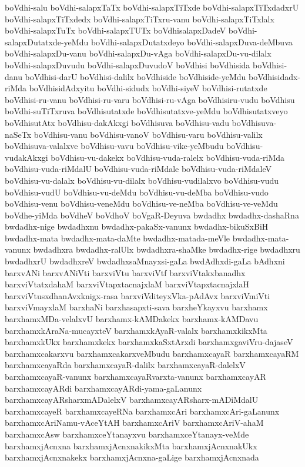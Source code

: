 {boVdhi-salu
boVdhi-salapxTaTx
boVdhi-salapxTiTxde
boVdhi-salapxTiTxdadxrU
boVdhi-salapxTiTxdedx
boVdhi-salapxTiTxru-vanu
boVdhi-salapxTiTxlalx
boVdhi-salapxTuTx
boVdhi-salapxTUTx
boVdhisalapxDadeV
boVdhi-salapxDutatxde-yeMdu
boVdhi-salapxDutatxdeyo
boVdhi-salapxDuva-deMbuva
boVdhi-salapxDu-vanu
boVdhi-salapxDu-vAga
boVdhi-salapxDu-vu-dilalx
boVdhi-salapxDuvudu
boVdhi-salapxDuvudoV
boVdhisi
boVdhisida
boVdhisi-danu
boVdhisi-darU
boVdhisi-dalilx
boVdhiside
boVdhiside-yeMdu
boVdhisidadx-riMda
boVdhisidAdxyitu
boVdhi-sidudx
boVdhi-siyeV
boVdhisi-rutatxde
boVdhisi-ru-vanu
boVdhisi-ru-varu
boVdhisi-ru-vAga
boVdhisiru-vudu
boVdhisu
boVdhi-suTiTxruva
boVdhisutatxde
boVdhisutatxve-yeMdu
boVdhisutatxveyo
boVdhisutAtx
boVdhisu-dakAkxgi
boVdhisuva
boVdhisu-vadu
boVdhisuva-naSeTx
boVdhisu-vanu
boVdhisu-vanoV
boVdhisu-varu
boVdhisu-valilx
boVdhisuva-valalxve
boVdhisu-vavu
boVdhisu-vike-yeMbudu
boVdhisu-vudakAkxgi
boVdhisu-vu-dakekx
boVdhisu-vuda-ralelx
boVdhisu-vuda-riMda
boVdhisu-vuda-riMdalU
boVdhisu-vuda-riMdale
boVdhisu-vuda-riMdaleV
boVdhisu-vu-dalalx
boVdhisu-vu-dilalx
boVdhisu-vudilalxvo
boVdhisu-vudu
boVdhisu-vudU
boVdhisu-vu-deMdu
boVdhisu-vu-deMba
boVdhisu-vudo
boVdhisu-venu
boVdhisu-veneMdu
boVdhisu-ve-neMba
boVdhisu-ve-veMdu
boVdhe-yiMda
boVdheV
boVdhoV
boVgaR-Deyuva
bwdadhx
bwdadhx-dashaRna
bwdadhx-nige
bwdadhxnu
bwdadhx-pakaSx-vanunx
bwdadhx-bikuSxBiH
bwdadhx-mata
bwdadhx-mata-daMte
bwdadhx-matada-meVle
bwdadhx-mata-vanunx
bwdadhxra
bwdadhx-ralUlx
bwdadhxra-shaMke
bwdadhx-rige
bwdadhxru
bwdadhxrU
bwdadhxreV
bwdadhxsaMnayxsi-gaLa
bwdAdhxdi-gaLa
bAdhxni
barxvANi
barxvANiVti
barxviVtu
barxviVtf
barxviVtakxbanadhx
barxviVtatxdahaM
barxviVtapxtacnajxlaM
barxviVtapxtacnajxlaH
barxviVtusxdhanAvxknigx-rasa
barxviVditeyxVka-pAdAvx
barxviVmiVti
barxviVmayxlaM
barxhaNi
barxhasapxti-sava
barxheYkayxvu
barxhamx
barxhamxMDa-velalxvU
barxhamx-kAMDakekx
barxhamx-kAMDavu
barxhamxkAraNa-mucayxteV
barxhamxkAyaR-valalx
barxhamxkikxMta
barxhamxkUkx
barxhamxkekx
barxhamxkaSxtArxdi
barxhamxgaviVru-dajaseV
barxhamxcakarxvu
barxhamxcakarxveMbudu
barxhamxcayaR
barxhamxcayaRM
barxhamxcayaRda
barxhamxcayaR-dalilx
barxhamxcayaR-dalelxV
barxhamxcayaR-vanunx
barxhamxcayaRvarxta-vanunx
barxhamxcayAR
barxhamxcayARdi
barxhamxcayARdi-yama-gaLanunx
barxhamxcayARsharxmADalelxV
barxhamxcayARsharx-mADiMdalU
barxhamxcayeR
barxhamxcayeRNa
barxhamxcAri
barxhamxcAri-gaLanunx
barxhamxcAriNamu-vAceYtAH
barxhamxcAriV
barxhamxcAriV-ahaM
barxhamxcAsw
barxhamxceYtanayxvu
barxhamxceYtanayx-veMde
barxhamxjAcnxna
barxhamxjAcnxnakikxMta
barxhamxjAcnxnakUkx
barxhamxjAcnxnakekx
barxhamxjAcnxna-gaLige
barxhamxjAcnxnada
}
